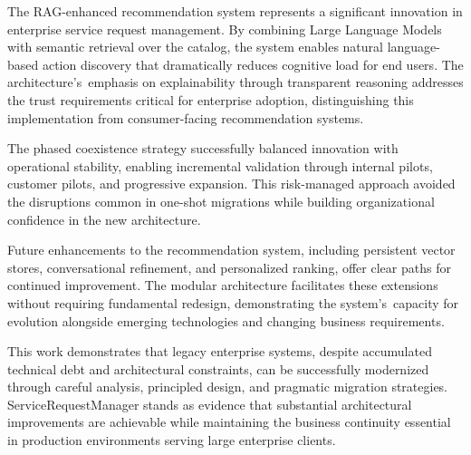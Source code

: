 
The RAG-enhanced recommendation system represents a significant innovation in enterprise service request management. By combining Large Language Models with semantic retrieval over the catalog, the system enables natural language-based action discovery that dramatically reduces cognitive load for end users. The architecture's~emphasis on explainability through transparent reasoning addresses the trust requirements critical for enterprise adoption, distinguishing this implementation from consumer-facing recommendation systems.


The phased coexistence strategy successfully balanced innovation with operational stability, enabling incremental validation through internal pilots, customer pilots, and progressive expansion. This risk-managed approach avoided the disruptions common in one-shot migrations while building organizational confidence in the new architecture.

Future enhancements to the recommendation system, including persistent vector stores, conversational refinement, and personalized ranking, offer clear paths for continued improvement. The modular architecture facilitates these extensions without requiring fundamental redesign, demonstrating the system's~capacity for evolution alongside emerging technologies and changing business requirements.

This work demonstrates that legacy enterprise systems, despite accumulated technical debt and architectural constraints, can be successfully modernized through careful analysis, principled design, and pragmatic migration strategies. ServiceRequestManager stands as evidence that substantial architectural improvements are achievable while maintaining the business continuity essential in production environments serving large enterprise clients.